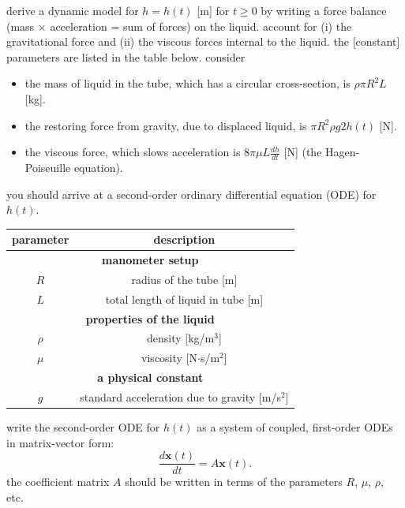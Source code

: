 \documentclass[addpoints]{exam}
\begin{document}
\begin{questions}

        
\question derive a dynamic model for $h=h(t)$ [m] for $t\geq 0$ by writing a force balance (mass $\times$ acceleration = sum of forces) on the liquid. account for (i) the gravitational force and (ii) the viscous forces internal to the liquid.
    the [constant] parameters are listed in the table below. 
    consider
    \begin{itemize}
        \item the mass of liquid in the tube, which has a circular cross-section, is $\rho \pi R^2 L$ [kg].
        \item the restoring force from gravity, due to displaced liquid, is $\pi R^2 \rho g 2 h(t) $ [N].
        \item the viscous force, which slows acceleration is $8\pi \mu L \frac{dh}{dt}$ [N] (the Hagen-Poiseuille equation).
    \end{itemize}
    you should arrive at a second-order ordinary differential equation (ODE) for $h(t)$.


        \begin{center}
        \begin{tabular}{ c c }
         parameter & description  \\
         \hline
         \multicolumn{2}{c}{\textbf{manometer setup}} \\
         $R$ & radius of the tube [m] \\ 
         $L$ & total length of liquid in tube [m]\\
         \multicolumn{2}{c}{\textbf{properties of the liquid}} \\
         $\rho$ & density [kg/m$^3$]\\
         $\mu$ & viscosity [N$\cdot$s/m$^2$] \\
         \multicolumn{2}{c}{\textbf{a physical constant}} \\
         $g$ & standard acceleration due to gravity [m/s$^2$]
        \end{tabular}
    \end{center}

\question write the second-order ODE for $h(t)$ as a system of coupled, first-order ODEs in matrix-vector form:
\begin{equation*}
	\frac{d \mathbf{x}(t)}{dt}=A\mathbf{x}(t).
\end{equation*}
the coefficient matrix $A$ should be written in terms of the parameters $R$, $\mu$, $\rho$, etc.


\end{questions}
\end{document}
